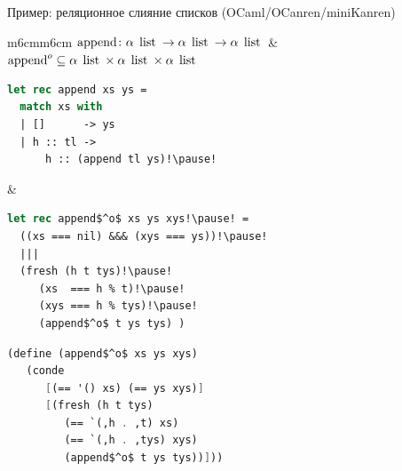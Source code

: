 \documentclass[10pt, mathserif]{beamer}
\let\\\tabularnewline
\let\\\tabularnewline
\newcommand{\oo}[1]{{#1}^o}
\newcommand{\inml}[1]{\mbox{\lstinline{#1}}}
\newcommand{\graybox}[1]{\colorbox{light-gray}{#1}}
\theoremstyle{definition}
\begin{document}
\begin{frame}[fragile]{Пример: реляционное слияние списков (OCaml/OCanren/miniKanren)}
\begin{adjustwidth}{-1.5em}{-1.5em}
\begin{tabular}{m{6cm}m{6cm}}
 \graybox{$\inml{append} \colon \alpha\:\inml{list} \to \alpha\:\inml{list} \to \alpha\:\inml{list}$} &
 \graybox{$\oo{\inml{append}}\subseteq\alpha\:\inml{list}\times\alpha\:\inml{list}\times\alpha\:\inml{list}$}\\
 \begin{lstlisting}[language=ocaml]
let rec append xs ys =
  match xs with
  | []      -> ys
  | h :: tl ->
      h :: (append tl ys)!\pause!
 \end{lstlisting} &
 \begin{lstlisting}[mathescape=true,language=ocaml]
let rec append$^o$ xs ys xys!\pause! =
  ((xs === nil) &&& (xys === ys))!\pause!
  |||
  (fresh (h t tys)!\pause!
     (xs  === h % t)!\pause!
     (xys === h % tys)!\pause!
     (append$^o$ t ys tys) )
 \end{lstlisting}
\end{tabular}\pause
\begin{center}
\begin{minipage}{6cm}
\begin{lstlisting}[mathescape=true,language=scheme]
(define (append$^o$ xs ys xys)
   (conde
      [(== '() xs) (== ys xys)]
      [(fresh (h t tys)
         (== `(,h . ,t) xs)
         (== `(,h . ,tys) xys)
         (append$^o$ t ys tys))]))
\end{lstlisting}
\end{minipage}
\end{center}

\end{adjustwidth}
\vskip5mm
\end{frame}
\end{document}
